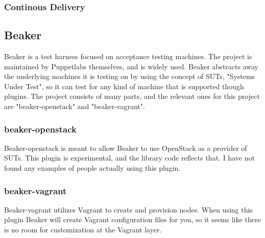 \subsubsection{Continous Delivery}

\cite{cddef}

\subsection{Beaker}

Beaker\cite{beakergithub} is a test harness focused on acceptance testing machines. The project is maintained by Puppetlabs themselves, and is widely used. Beaker abstracts away the underlying machines it is testing on by using the concept of SUTs, "Systems Under Test", so it can test for any kind of machine that is supported though plugins. The project consists of many parts, and the relevant ones for this project are "beaker-openstack"\cite{beakeropenstackgithub} and "beaker-vagrant"\cite{beakervagrantgithub}.



\subsubsection{beaker-openstack}

Beaker-openstack is meant to allow Beaker to use OpenStack as a provider of SUTs. This plugin is experimental, and the library code reflects that. I have not found any examples of people actually using this plugin.

\subsubsection{beaker-vagrant}

Beaker-vagrant utilizes Vagrant to create and provision nodes. When using this plugin Beaker will create Vagrant configuration files for you, so it seems like there is no room for customization at the Vagrant layer.

